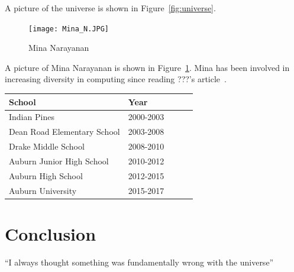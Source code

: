 \documentclass{article}
\begin{document}
A picture of the universe is shown in Figure~\ref{fig:universe}.

\begin{figure}[h!]
\centering
\texttt{[image: Mina\_N.JPG]}
\caption{Mina Narayanan}
\label{fig:Mina_N}
\end{figure}

A picture of Mina Narayanan is shown in Figure~\ref{fig:Mina_N}. Mina has been involved in increasing diversity in computing since reading ???'s article~\cite{adams1995hitchhiker}.

\begin{table}
\begin{tabular}{lllcl}\hline{}
{\bf School} & {\bf Year} \\\hline
   Indian Pines & 2000-2003 \\
Dean Road Elementary School & 2003-2008 \\
Drake Middle School & 2008-2010\\
Auburn Junior High School & 2010-2012\\
Auburn High School & 2012-2015 \\
Auburn University & 2015-2017 \\\hline
\end{tabular}
\end{table}

\section{Conclusion}
``I always thought something was fundamentally wrong with the universe'' \citep{adams1995hitchhiker}



\end{document}
